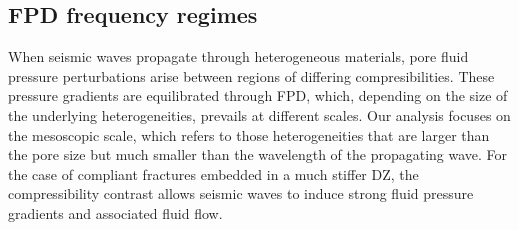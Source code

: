 \documentclass[draft]{agujournal2019}
\begin{document}
\subsection{FPD frequency regimes}
When seismic waves propagate through heterogeneous materials, pore fluid pressure perturbations arise between regions of differing compresibilities. These pressure gradients are equilibrated through FPD, which, depending on the size of the underlying heterogeneities, prevails at different scales. Our analysis focuses on the mesoscopic scale, which refers to those heterogeneities that are larger than the pore size but much smaller than the wavelength of the propagating wave. For the case of compliant fractures embedded in a much stiffer DZ, the compressi\-bility contrast allows seismic waves to induce strong fluid pressure gradients and  associated fluid flow.
\end{document}
